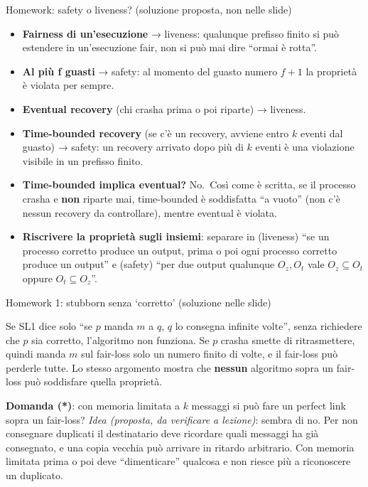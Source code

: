 \begin{approfondimento}{Homework: safety o liveness? (soluzione proposta, non nelle slide)}

\begin{itemize}
\tightlist
\item
  \textbf{Fairness di un'esecuzione} → liveness: qualunque prefisso finito si può estendere in un'esecuzione fair, non si può mai dire ``ormai è rotta''.
\item
  \textbf{Al più f guasti} → safety: al momento del guasto numero \(f+1\) la proprietà è violata per sempre.
\item
  \textbf{Eventual recovery} (chi crasha prima o poi riparte) → liveness.
\item
  \textbf{Time-bounded recovery} (se c'è un recovery, avviene entro \(k\) eventi dal guasto) → safety: un recovery arrivato dopo più di \(k\) eventi è una violazione visibile in un prefisso finito.
\item
  \textbf{Time-bounded implica eventual?} No.~Così come è scritta, se il processo crasha e \textbf{non} riparte mai, time-bounded è soddisfatta ``a vuoto'' (non c'è nessun recovery da controllare), mentre eventual è violata.
\item
  \textbf{Riscrivere la proprietà sugli insiemi}: separare in (liveness) ``se un processo corretto produce un output, prima o poi ogni processo corretto produce un output'' e (safety) ``per due output qualunque \(O_z, O_t\) vale \(O_z \subseteq O_t\) oppure \(O_t \subseteq O_z\)''.
\end{itemize}

\end{approfondimento}

\begin{approfondimento}{Homework 1: stubborn senza `corretto' (soluzione nelle slide)}

Se SL1 dice solo ``se \(p\) manda \(m\) a \(q\), \(q\) lo consegna infinite volte'', senza richiedere che \(p\) sia corretto, l'algoritmo non funziona. Se \(p\) crasha smette di ritrasmettere, quindi manda \(m\) sul fair-loss solo un numero finito di volte, e il fair-loss può perderle tutte. Lo stesso argomento mostra che \textbf{nessun} algoritmo sopra un fair-loss può soddisfare quella proprietà.

\textbf{Domanda (*)}: con memoria limitata a \(k\) messaggi si può fare un perfect link sopra un fair-loss? \emph{Idea (proposta, da verificare a lezione)}: sembra di no. Per non consegnare duplicati il destinatario deve ricordare quali messaggi ha già consegnato, e una copia vecchia può arrivare in ritardo arbitrario. Con memoria limitata prima o poi deve ``dimenticare'' qualcosa e non riesce più a riconoscere un duplicato.

\end{approfondimento}

